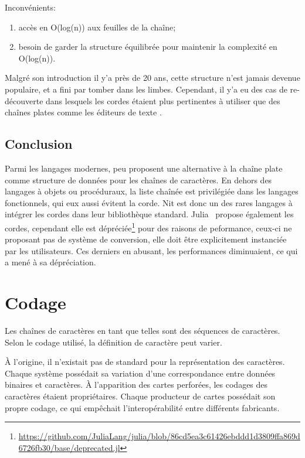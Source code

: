 Inconvénients:
\begin{enumerate}
	\item accès en O(log(n)) aux feuilles de la chaîne;
	\item besoin de garder la structure équilibrée pour maintenir la complexité en O(log(n)).
\end{enumerate}

Malgré son introduction il y'a près de 20 ans, cette structure n'est
jamais devenue populaire, et a fini par tomber dans les limbes.
Cependant, il y'a eu des cas de re-découverte dans lesquels les cordes
étaient plus pertinentes à utiliser que des chaînes plates comme les éditeurs de
texte \cite{inria_rope}.

\subsection{Conclusion}

Parmi les langages modernes, peu proposent une alternative à la chaîne plate comme structure de
données pour les chaînes de caractères.
En dehors des langages à objets ou procéduraux, la liste chaînée est privilégiée dans les
langages fonctionnels, qui eux aussi évitent la corde.
Nit est donc un des rares langages à intégrer les cordes dans leur bibliothèque standard.
Julia~\cite{bezanson2012julia} propose également les cordes, cependant elle est dépréciée\footnote{
\url{https://github.com/JuliaLang/julia/blob/86cd5ea3c61426ebddd1d3809ffa869d6726fb30/base/deprecated.jl}}
pour des raisons de peformance, ceux-ci ne proposant pas de système de conversion, elle doit être
explicitement instanciée par les utilisateurs.
Ces derniers en abusant, les performances diminuaient, ce qui a mené à sa dépréciation.

\section{Codage}

Les chaînes de caractères en tant que telles sont des séquences de caractères.
Selon le codage utilisé, la définition de caractère peut varier.

À l'origine, il n'existait pas de standard pour la représentation des caractères.
Chaque système possédait sa variation d'une correspondance entre données binaires
et caractères.
À l'apparition des cartes perforées, les codages des caractères étaient propriétaires.
Chaque producteur de cartes possédait son propre codage, ce qui empêchait
l'interopérabilité entre différents fabricants.

